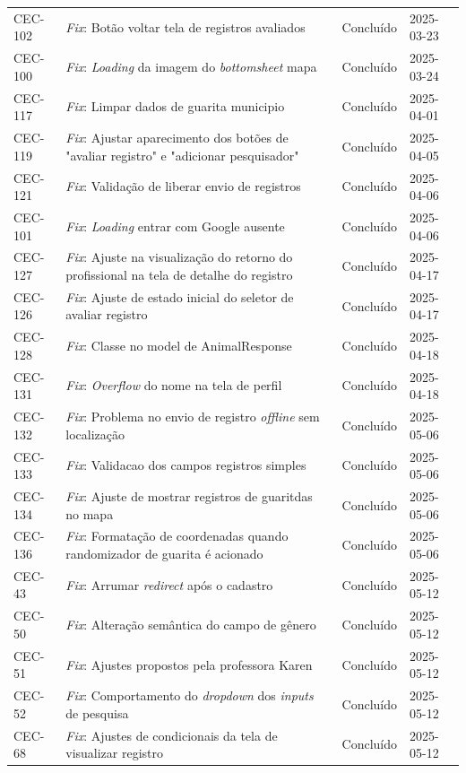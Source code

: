 \begin{longtable}{@{}lp{7cm}ll@{}}
CEC-102 & \textit{Fix}: Botão voltar tela de registros avaliados & Concluído & 2025-03-23 \\
CEC-100 & \textit{Fix}: \textit{Loading} da imagem do \textit{bottomsheet} mapa & Concluído & 2025-03-24 \\
CEC-117 & \textit{Fix}: Limpar dados de guarita municipio & Concluído & 2025-04-01 \\
CEC-119 & \textit{Fix}: Ajustar aparecimento dos botões de "avaliar registro" e "adicionar pesquisador" & Concluído & 2025-04-05 \\
CEC-121 & \textit{Fix}: Validação de liberar envio de registros & Concluído & 2025-04-06 \\
CEC-101 & \textit{Fix}: \textit{Loading} entrar com Google ausente & Concluído & 2025-04-06 \\
CEC-127 & \textit{Fix}: Ajuste na visualização do retorno do profissional na tela de detalhe do registro & Concluído & 2025-04-17 \\
CEC-126 & \textit{Fix}: Ajuste de estado inicial do seletor de avaliar registro & Concluído & 2025-04-17 \\
CEC-128 & \textit{Fix}: Classe no model de AnimalResponse & Concluído & 2025-04-18 \\
CEC-131 & \textit{Fix}: \textit{Overflow} do nome na tela de perfil & Concluído & 2025-04-18 \\
CEC-132 & \textit{Fix}: Problema no envio de registro \textit{offline} sem localização & Concluído & 2025-05-06 \\
CEC-133 & \textit{Fix}: Validacao dos campos registros simples & Concluído & 2025-05-06 \\
CEC-134 & \textit{Fix}: Ajuste de mostrar registros de guaritdas no mapa & Concluído & 2025-05-06 \\
CEC-136 & \textit{Fix}: Formatação de coordenadas quando randomizador de guarita é acionado & Concluído & 2025-05-06 \\
CEC-43 & \textit{Fix}: Arrumar \textit{redirect} após o cadastro & Concluído & 2025-05-12 \\
CEC-50 & \textit{Fix}: Alteração semântica do campo de gênero & Concluído & 2025-05-12 \\
CEC-51 & \textit{Fix}: Ajustes propostos pela professora Karen & Concluído & 2025-05-12 \\
CEC-52 & \textit{Fix}: Comportamento do \textit{dropdown} dos \textit{inputs} de pesquisa & Concluído & 2025-05-12 \\
CEC-68 & \textit{Fix}: Ajustes de condicionais da tela de visualizar registro & Concluído & 2025-05-12 \\

\end{longtable}
